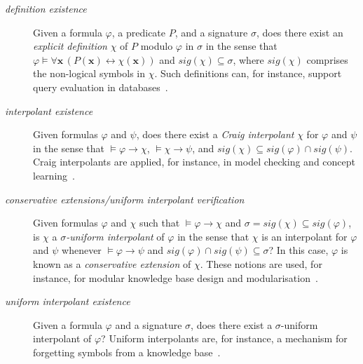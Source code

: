 \documentclass[10pt,a4paper]{amsart}
\theoremstyle{plain}
\theoremstyle{definition}
\newcommand{\avec}[1]{\boldsymbol{#1}}
\newcommand{\sig}{\mathit{sig}}
\begin{document}
\begin{description} 
\item[\emph{definition existence}] Given a formula $\varphi$, a predicate $P$, and a signature $\sigma$, does there exist an \emph{explicit definition} $\chi$ of $P$ modulo $\varphi$ in $\sigma$ in the sense that \mbox{$\varphi\models \forall \avec{x}\, (P(\avec{x}) \leftrightarrow \chi(\avec{x}))$} and $\sig(\chi)\subseteq \sigma$, where $\sig(\chi)$ comprises the non-logical symbols in $\chi$. Such definitions can, for instance, support query evaluation in databases~\cite{DBLP:series/synthesis/2011Toman,DBLP:series/synthesis/2016Benedikt}.

\item[\emph{interpolant existence}] Given formulas $\varphi$ and $\psi$, does there exist a \emph{Craig interpolant} $\chi$ for $\varphi$ and $\psi$ in the sense 
that $\models \varphi \rightarrow \chi$, $\models \chi \rightarrow \psi$, and
\mbox{$\sig(\chi)\subseteq \sig(\varphi) \cap \sig(\psi)$}. Craig interpolants are applied, for instance, in model checking and concept learning~\cite{DBLP:reference/mc/McMillan18,DBLP:journals/ai/JungLPW22}.

\item[\emph{conservative extensions/uniform interpolant verification}] Given formulas $\varphi$ and $\chi$ such that $\models \varphi \rightarrow \chi$ and $\sigma=\sig(\chi)\subseteq \sig(\varphi)$, is $\chi$ a \emph{$\sigma$-uniform interpolant} of $\varphi$ in the sense that $\chi$ is an interpolant for $\varphi$ and $\psi$ whenever $\models \varphi\rightarrow \psi$ and $\sig(\varphi)\cap \sig(\psi) \subseteq \sigma$? In this case, $\varphi$ is known as a \emph{conservative extension} of $\chi$. These notions are used, for instance, for modular knowledge base design and modularisation~\cite{DBLP:conf/rweb/BotoevaKLRWZ16}.  

\item[\emph{uniform interpolant existence}] Given a formula $\varphi$ and a signature $\sigma$, does there exist a $\sigma$-uniform interpolant 
of $\varphi$? Uniform interpolants are, for instance, a mechanism for forgetting symbols from a knowledge base~\cite{DBLP:journals/ki/EiterK19,DBLP:journals/tplp/GoncalvesKL23,DBLP:series/lncs/KonevLWW09,DBLP:journals/ki/Koopmann20}.
\end{description} 
\end{document}
